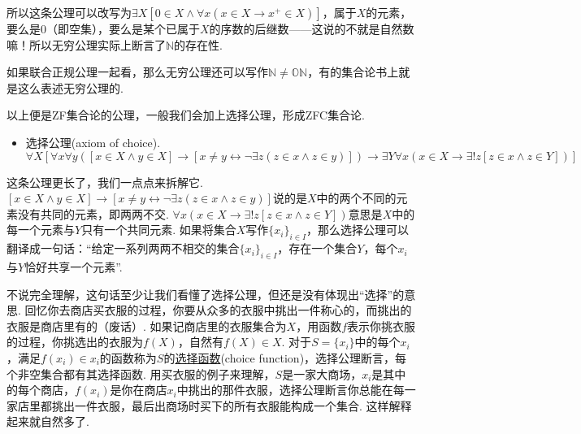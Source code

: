 \documentclass[main.tex]{subfiles}
\begin{document}
\begin{itemize}
\begin{note}
        所以这条公理可以改写为\(\exists X[0 \in X \wedge \forall x(x \in X \rightarrow x^+ \in X)]\)，属于\(X\)的元素，要么是0（即空集），要么是某个已属于\(X\)的序数的后继数——这说的不就是自然数嘛！所以无穷公理实际上断言了\(\mathbb{N}\)的存在性.

        如果联合正规公理一起看，那么无穷公理还可以写作\(\mathbb{N} \neq \mathbb{ON}\)，有的集合论书上就是这么表述无穷公理的.
    \end{note}
\end{itemize}

\vspace{1cm}

以上便是\textsf{ZF}集合论的公理，一般我们会加上选择公理，形成\textsf{ZFC}集合论.

\begin{itemize}
    \item  [(7)] 选择公理(axiom of choice).
    \[\forall X [\forall x \forall y([x \in X \wedge y \in X] \rightarrow [x \neq y \leftrightarrow \neg \exists z(z \in x \wedge z \in y)]) \rightarrow \exists Y \forall x(x \in X \rightarrow \exists! z[z \in x \wedge z \in Y])]\]
\end{itemize}

\begin{note}
    这条公理更长了，我们一点点来拆解它. \([x \in X \wedge y \in X] \rightarrow [x \neq y \leftrightarrow \neg \exists z(z \in x \wedge z \in y)]\)说的是\(X\)中的两个不同的元素没有共同的元素，即两两不交. \(\forall x(x \in X \rightarrow \exists! z[z \in x \wedge z \in Y])\)意思是\(X\)中的每一个元素与\(Y\)只有一个共同元素. 如果将集合\(X\)写作\(\{x_i\}_{i \in I}\)，那么选择公理可以翻译成一句话：“给定一系列两两不相交的集合\(\{x_i\}_{i \in I}\)，存在一个集合\(Y\)，每个\(x_i\)与\(Y\)恰好共享一个元素”.

    不说完全理解，这句话至少让我们看懂了选择公理，但还是没有体现出“选择”的意思. 回忆你去商店买衣服的过程，你要从众多的衣服中挑出一件称心的，而挑出的衣服是商店里有的（废话）. 如果记商店里的衣服集合为\(X\)，用函数\(f\)表示你挑衣服的过程，你挑选出的衣服为\(f(X)\)，自然有\(f(X) \in X\). 对于\(S=\{x_i\}\)中的每个\(x_i\)，满足\(f(x_i) \in x_i\)的函数称为\(S\)的\uline{选择函数}(choice function)，选择公理断言，每个非空集合都有其选择函数. 用买衣服的例子来理解，\(S\)是一家大商场，\(x_i\)是其中的每个商店，\(f(x_i)\)是你在商店\(x_i\)中挑出的那件衣服，选择公理断言你总能在每一家店里都挑出一件衣服，最后出商场时买下的所有衣服能构成一个集合. 这样解释起来就自然多了.
\end{note}

\vspace{1cm}
\end{document}
